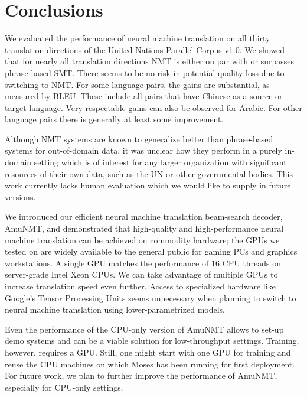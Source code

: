 \documentclass[11pt]{article}
\begin{document}
\section{Conclusions}

We evaluated the performance of neural machine translation on all thirty translation directions of the United Nations Parallel Corpus v1.0. We showed that for nearly all translation directions NMT is either on par with or surpasses phrase-based SMT. There seems to be no risk in potential quality loss due to switching to NMT. For some language pairs, the gains are substantial, as measured by BLEU. These include all pairs that have Chinese as a source or target language. Very respectable gains can also be observed for Arabic. For other language pairs there is generally at least some improvement. 

Although NMT systems are known to generalize better than phrase-based systems for out-of-domain data, it was unclear how they perform in a purely in-domain setting which is of interest for any larger organization with significant resources of their own data, such as the UN or other governmental bodies. This work currently lacks human evaluation which we would like to supply in future versions. 

We introduced our efficient neural machine translation beam-search decoder, AmuNMT, and demonstrated that high-quality and high-performance neural machine translation can be achieved on commodity hardware; the GPUs we tested on are widely available to the general public for gaming PCs and graphics workstations. A single GPU matches the performance of 16 CPU threads on server-grade Intel Xeon CPUs. We can take advantage of multiple GPUs to increase translation speed even further. Access to specialized hardware like Google's Tensor Processing Units seems unnecessary when planning to switch to neural machine translation using lower-parametrized models. 

Even the performance of the CPU-only version of AmuNMT allows to set-up demo systems and can be a viable solution for low-throughput settings. Training, however, requires a GPU. Still, one might start with one GPU for training and reuse the CPU machines on which Moses has been running  for first deployment. For future work, we plan to further improve the performance of AmuNMT, especially for CPU-only settings.





\end{document}
